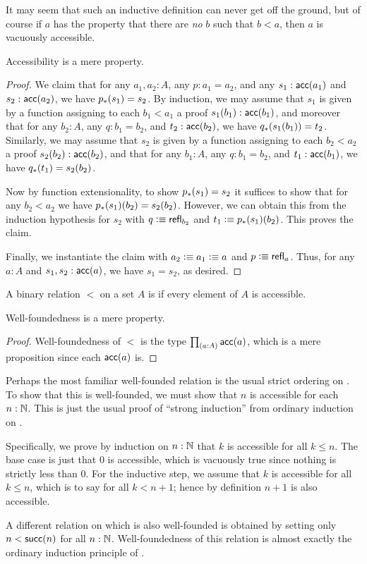 It may seem that such an inductive definition can never get off the ground, but of course if $a$ has the property that there are \emph{no} $b$ such that $b<a$, then $a$ is vacuously accessible.

\begin{lem}
  Accessibility is a mere property.
\end{lem}
\begin{proof}
  We claim that for any $a_1,a_2:A$, any $p:a_1=a_2$, and any $s_1:\mathsf{acc}(a_1)$ and $s_2:\mathsf{acc}(a_2)$, we have ${p}_{*}\mathopen{}\left({s_1}\right)\mathclose{}=s_2$.
  By induction, we may assume that $s_1$ is given by a function assigning to each $b_1<a_1$ a proof $s_1(b_1):\mathsf{acc}(b_1)$, and moreover that for any $b_2:A$, any $q:b_1=b_2$, and $t_2:\mathsf{acc}(b_2)$, we have ${q}_{*}\mathopen{}\left({s_1(b_1)}\right)\mathclose{}=t_2$.
  Similarly, we may assume that $s_2$ is given by a function assigning to each $b_2<a_2$ a proof $s_2(b_2):\mathsf{acc}(b_2)$, and that for any $b_1:A$, any $q:b_1=b_2$, and $t_1:\mathsf{acc}(b_1)$, we have ${q}_{*}\mathopen{}\left({t_1}\right)\mathclose{}=s_2(b_2)$.
  
  Now by function extensionality, to show ${p}_{*}\mathopen{}\left({s_1}\right)\mathclose{}=s_2$ it suffices to show that for any $b_2<a_2$ we have ${p}_{*}\mathopen{}\left({s_1}\right)\mathclose{}(b_2) = s_2(b_2)$.
  However, we can obtain this from the induction hypothesis for $s_2$ with $q\vcentcolon\equiv \mathsf{refl}_{b_2}$ and $t_1 \vcentcolon\equiv {p}_{*}\mathopen{}\left({s_1}\right)\mathclose{}(b_2)$.
  This proves the claim.

  Finally, we instantiate the claim with $a_2\vcentcolon\equiv a_1\vcentcolon\equiv a$ and $p\vcentcolon\equiv \mathsf{refl}_{a}$.
  Thus, for any $a:A$ and $s_1,s_2:\mathsf{acc}(a)$, we have $s_1=s_2$, as desired.
\end{proof}

\begin{defn}
  A binary relation $<$ on a set $A$ is  if every element of $A$ is accessible.
\end{defn}

\begin{lem}
  Well-foundedness is a mere property.
\end{lem}
\begin{proof}
  Well-foundedness of $<$ is the type $\prd{a:A} \acc(a)$, which is a mere proposition since each $\mathsf{acc}(a)$ is.
\end{proof}

\begin{eg}\label{thm:nat-wf}
  Perhaps the most familiar well-founded relation is the usual strict ordering on \nat.
  To show that this is well-founded, we must show that $n$ is accessible for each $n:\mathbb{N}$.
  This is just the usual proof of ``strong induction'' from ordinary induction on \nat.

  Specifically, we prove by induction on $n:\mathbb{N}$ that $k$ is accessible for all $k\le n$.
  The base case is just that $0$ is accessible, which is vacuously true since nothing is strictly less than $0$.
  For the inductive step, we assume that $k$ is accessible for all $k\le n$, which is to say for all $k<n+1$; hence by definition $n+1$ is also accessible.

  A different relation on \nat which is also well-founded is obtained by setting only $n < \mathsf{succ}(n)$ for all $n:\mathbb{N}$.
  Well-foundedness of this relation is almost exactly the ordinary induction principle of \nat.
\end{eg}

